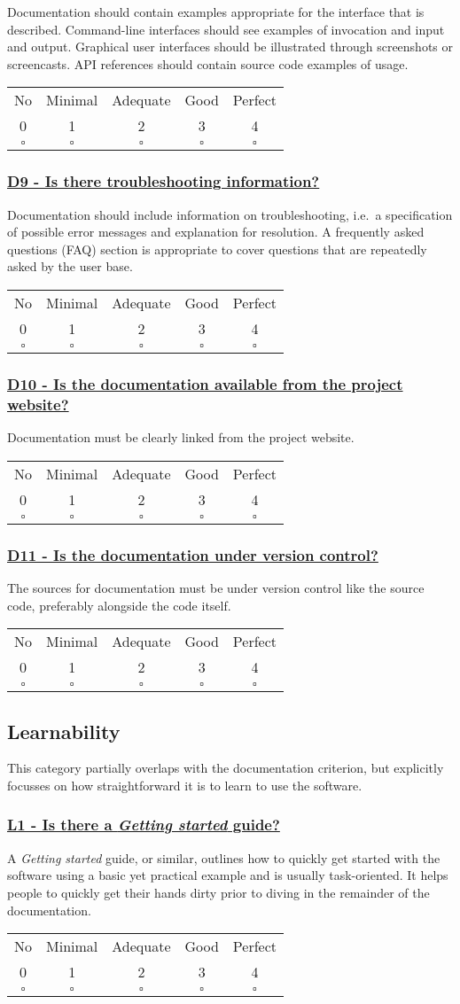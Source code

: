 \documentclass[a4paper,11pt]{article}
\newcommand{\criterion}[2]{\subsubsection*{\underline{#1 - #2}}\label{id:#1}}
\newcommand\CheckTable{%
  \begin{tabular}{ccccc}
    No & Minimal & Adequate & Good & Perfect \\
    0 & 1 & 2 & 3 & 4 \\
    \hline
    $\square$ & $\square$ & $\square$ & $\square$ & $\square$ \\
  \end{tabular}%
}
\begin{document}
Documentation should contain examples appropriate for the interface that is
described. Command-line interfaces should see examples of invocation and input
and output. Graphical user interfaces should be illustrated through screenshots or
screencasts. API references should contain source code examples of usage.

\CheckTable

\newcommand{\dNineID}{D9}
\newcommand{\dNineText}{Is there troubleshooting information?}
\criterion{\dNineID}{\dNineText}

Documentation should include information on troubleshooting, i.e.\ a
specification of possible error messages and explanation for resolution. A
frequently asked questions (FAQ) section is appropriate to cover questions
that are repeatedly asked by the user base.

\CheckTable

\newcommand{\dTenID}{D10}
\newcommand{\dTenText}{Is the documentation available from the project website?}
\criterion{\dTenID}{\dTenText}

Documentation must be clearly linked from the project website.

\CheckTable

\newcommand{\dElevenID}{D11}
\newcommand{\dElevenText}{Is the documentation under version control?}
\criterion{\dElevenID}{\dElevenText}

The sources for documentation must be under version control like the source
code, preferably alongside the code itself.

\CheckTable

\subsection{Learnability}\label{sec:lea}

This category partially overlaps with the documentation criterion, but explicitly
focusses on how straightforward it is to learn to use the software.

\newcommand{\lOneID}{L1}
\newcommand{\lOneText}{Is there a \textit{Getting started} guide?}
\criterion{\lOneID}{\lOneText}

A \textit{Getting started} guide, or similar, outlines how to quickly get
started with the software using a basic yet practical example and is usually task-oriented.
It helps people to quickly get their hands dirty prior to diving in the
remainder of the documentation. 

\CheckTable
\end{document}
